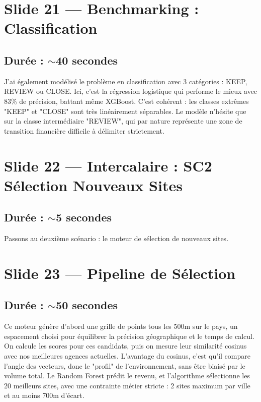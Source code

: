 \documentclass[11pt,a4paper]{article}
\begin{document}
\section{Slide 21 --- Benchmarking : Classification}
\subsection{Durée : $\sim$40 secondes}
J'ai également modélisé le problème en classification avec 3 catégories : KEEP, REVIEW ou CLOSE. Ici, c'est la régression logistique qui performe le mieux avec 83\% de précision, battant même XGBoost. C'est cohérent : les classes extrêmes "KEEP" et "CLOSE" sont très linéairement séparables. Le modèle n'hésite que sur la classe intermédiaire "REVIEW", qui par nature représente une zone de transition financière difficile à délimiter strictement.

\section{Slide 22 --- Intercalaire : SC2 Sélection Nouveaux Sites}
\subsection{Durée : $\sim$5 secondes}
Passons au deuxième scénario : le moteur de sélection de nouveaux sites.

\section{Slide 23 --- Pipeline de Sélection}
\subsection{Durée : $\sim$50 secondes}
Ce moteur génère d'abord une grille de points tous les 500m sur le pays, un espacement choisi pour équilibrer la précision géographique et le temps de calcul. On calcule les scores pour ces candidats, puis on mesure leur similarité cosinus avec nos meilleures agences actuelles. L'avantage du cosinus, c'est qu'il compare l'angle des vecteurs, donc le "profil" de l'environnement, sans être biaisé par le volume total. Le Random Forest prédit le revenu, et l'algorithme sélectionne les 20 meilleurs sites, avec une contrainte métier stricte : 2 sites maximum par ville et au moins 700m d'écart.
\end{document}
